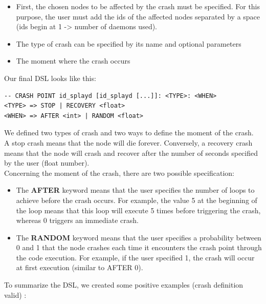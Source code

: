 \documentclass{eplmastersthesis}
\begin{document}
        \begin{itemize}
          \item First, the chosen nodes to be affected by the crash must be
          specified. For this purpose, the user must add the ids of the
          affected nodes separated by a space (ids begin at 1 -> number of
          daemons used).
          \item The type of crash can be specified by its name and optional
          parameters
          \item The moment where the crash occurs
        \end{itemize}

        Our final DSL looks like this:

        \begin{lstlisting}[style=MyBash]
-- CRASH POINT id_splayd [id_splayd [...]]: <TYPE>: <WHEN>
<TYPE> => STOP | RECOVERY <float>
<WHEN> => AFTER <int> | RANDOM <float>
        \end{lstlisting}

        We defined two types of crash and two ways to
        define the moment of the crash.\\
        A stop crash means that the node will die forever. Conversely, a
        recovery crash means that the node will crash and recover after the
        number of seconds specified by the user (float number).\\
        Concerning the moment of the crash, there are two possible specification:

        \begin{itemize}
          \item The \textbf{AFTER} keyword means that the user specifies the
          number of loops to achieve before the crash occurs. For example,
          the value 5 at the beginning of the loop means that this loop will
          execute 5 times before triggering the crash, whereas 0 triggers
          an immediate crash.
          \item The \textbf{RANDOM} keyword means that the user specifies a
          probability between 0 and 1 that the node crashes each time it
          encounters the crash point through the code execution. For example,
          if the user specified 1, the crash will occur at first execution
          (similar to AFTER 0).
        \end{itemize}

        To summarize the DSL, we created some positive examples (crash definition valid) :
\end{document}
